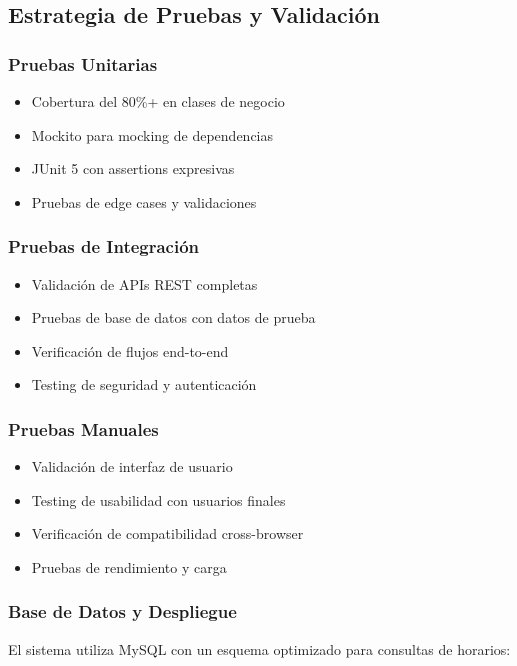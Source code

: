 \subsection{Estrategia de Pruebas y Validación}

\subsubsection{Pruebas Unitarias}
\begin{itemize}
\item Cobertura del 80\%+ en clases de negocio
\item Mockito para mocking de dependencias
\item JUnit 5 con assertions expresivas
\item Pruebas de edge cases y validaciones
\end{itemize}

\subsubsection{Pruebas de Integración}
\begin{itemize}
\item Validación de APIs REST completas
\item Pruebas de base de datos con datos de prueba
\item Verificación de flujos end-to-end
\item Testing de seguridad y autenticación
\end{itemize}

\subsubsection{Pruebas Manuales}
\begin{itemize}
\item Validación de interfaz de usuario
\item Testing de usabilidad con usuarios finales
\item Verificación de compatibilidad cross-browser
\item Pruebas de rendimiento y carga
\end{itemize}

\subsubsection{Base de Datos y Despliegue}

El sistema utiliza MySQL con un esquema optimizado para consultas de horarios:

